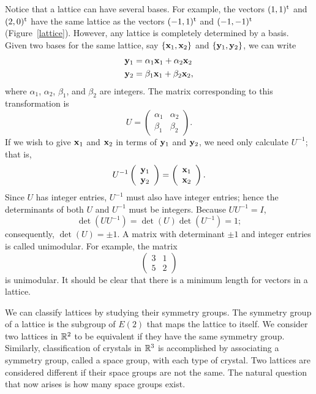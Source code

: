  
Notice that a lattice can have several bases. For example, the vectors
$(1,1)^{\rm t}$ and $(2,0)^{\rm t}$ have the  same lattice as the
vectors $(-1, 1)^{\rm t}$ and $(-1, -1)^{\rm t}$
(Figure~\ref{lattice}). However, any lattice is completely determined
by a basis. Given two bases for the same lattice, say $\{ {\bold x}_1,
{\bold x}_2 \}$ and $\{ {\bold y}_1, {\bold y}_2 \}$, we can write 
\begin{align*}
{\bold y}_1 & = \alpha_1  {\bold x}_1 + \alpha_2 {\bold x}_2 \\
{\bold y}_2 & = \beta_1  {\bold x}_1 + \beta_2 {\bold x}_2,
\end{align*}
where $\alpha_1$, $\alpha_2$, $\beta_1$, and $\beta_2$ are integers.
The matrix corresponding to this transformation is 
\[
U
=
\left(
\begin{array}{cc}
\alpha_1 & \alpha_2 \\
\beta_1 & \beta_2
\end {array}
\right).
\]
If we wish to give ${\bold x}_1$ and ${\bold x}_2$ in terms of ${\bold
y}_1$ and ${\bold y}_2$, we need only calculate $U^{-1}$; that is, 
\[
U^{-1}
\left(
\begin{array}{c}
{\bold y}_1 \\
{\bold y}_2
\end{array}
\right)
=
\left(
\begin{array}{c}
{\bold x}_1 \\
{\bold x}_2
\end{array}
\right).
\]
Since $U$ has integer entries, $U^{-1}$ must also have integer
entries; hence the determinants of both $U$ and $U^{-1}$ must be
integers. Because $U U^{-1} = I$,  
\[
\det(U U^{-1}) =\det(U) \det( U^{-1}) = 1;
\]
consequently, $\det(U) = \pm 1$. A matrix with determinant $\pm 1$ and
integer entries is called {\bfi unimodular}.
For example, the matrix 
\[
\left(
\begin{array}{cc}
3 & 1 \\
5 & 2
\end{array}
\right)
\]
is unimodular. It should be clear that there is a minimum length for
vectors in a lattice.  
 
 
We can classify lattices by studying their symmetry groups. The
symmetry group of a lattice is the subgroup of $E(2)$ that maps the
lattice to itself. We consider two lattices in ${\Bbb R}^2$ to be
equivalent if they have the same symmetry group.  Similarly,
classification of crystals in ${\Bbb R}^3$ is accomplished by
associating a symmetry group, called a {\bfi space group}, with each
type of crystal. Two lattices are considered
different if their space groups are not the same.  The natural
question that now arises is how many space groups exist. 
 
